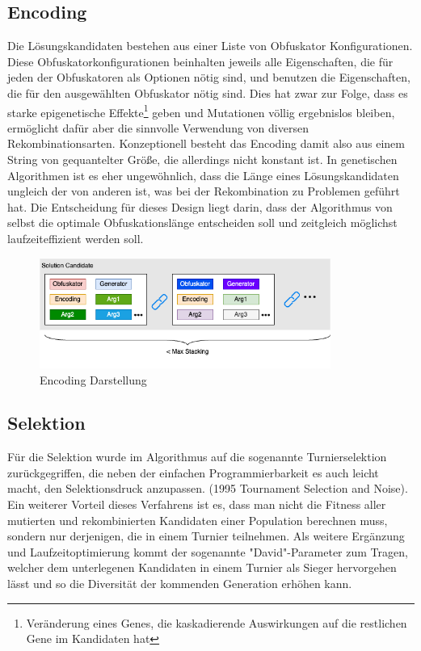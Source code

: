 \subsection{Encoding}
Die Lösungskandidaten bestehen aus einer Liste von Obfuskator Konfigurationen. Diese Obfuskatorkonfigurationen beinhalten jeweils alle Eigenschaften, die für jeden der Obfuskatoren als Optionen nötig sind, und benutzen die Eigenschaften, die für den ausgewählten Obfuskator nötig sind. Dies hat zwar zur Folge, dass es starke epigenetische Effekte\footnote{Veränderung eines Genes, die kaskadierende Auswirkungen auf die restlichen Gene im Kandidaten hat} geben und Mutationen völlig ergebnislos bleiben, ermöglicht dafür aber die sinnvolle Verwendung von diversen Rekombinationsarten. Konzeptionell besteht das Encoding damit also aus einem String von gequantelter Größe, die allerdings nicht konstant ist. 
In genetischen Algorithmen ist es eher ungewöhnlich, dass die Länge eines Lösungskandidaten ungleich der von anderen ist, was bei der Rekombination zu Problemen geführt hat. Die Entscheidung für dieses Design liegt darin, dass der Algorithmus von selbst die optimale Obfuskationslänge entscheiden soll und zeitgleich möglichst laufzeiteffizient werden soll.
\begin{figure}[h]
    \centering
    \includegraphics[width=0.85\textwidth]{gfx/Abbildungen/Encoding Diagram.png}
    \caption{Encoding Darstellung}
    \label{fig:encoding}
\end{figure}
\subsection{Selektion}
Für die Selektion wurde im Algorithmus auf die sogenannte Turnierselektion zurückgegriffen, die neben der einfachen Programmierbarkeit es auch leicht macht, den Selektionsdruck anzupassen. \cite{blickle_1996_a} (1995 Tournament Selection and Noise). Ein weiterer Vorteil dieses Verfahrens ist es, dass man nicht die Fitness aller mutierten und rekombinierten Kandidaten einer Population berechnen muss, sondern nur derjenigen, die in einem Turnier teilnehmen. Als weitere Ergänzung und Laufzeitoptimierung kommt der sogenannte "David"-Parameter zum Tragen, welcher dem unterlegenen Kandidaten in einem Turnier als Sieger hervorgehen lässt und so die Diversität der kommenden Generation erhöhen kann.

